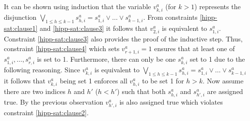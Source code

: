 \documentclass[12pt,a4paper]{article}
\begin{document}
It can be shown using induction that the variable $v^a_{k,i}$ (for $k>1$) represents the disjunction $\bigvee_{1\leq h\leq k-1}s^a_{h,i} = s^a_{1,i}\vee\dots \vee s^a_{k-1,i}$.
From constraints \eqref{hipp-sat:clause1} and \eqref{hipp-sat:clause3} it follows that $v^a_{2,i}$ is equivalent to $s^a_{1,i}$.
Constraint \eqref{hipp-sat:clause3} also provides the proof of the inductive step.
Thus, constraint \eqref{hipp-sat:clause4} which sets $v^a_{r+1,i}=1$ ensures that at least one of $s^a_{1,i},\dots , s^a_{r,i}$ is set to 1.
Furthermore, there can only be one $s^a_{k,i}$ set to 1 due to the following reasoning.
Since $v^a_{k,i}$ is equivalent to $\bigvee_{1\leq h\leq k-1}s^a_{h,i} = s^a_{1,i}\vee\dots \vee s^a_{k-1,i}$ it follows that $v^a_{k,i}$ being set 1 enforces all $v^a_{h,i}$ to be set 1 for $h>k$.
Now assume there are two indices $h$ and $h'$ ($h<h'$) such that both $s^a_{h,i}$ and $s^a_{h',i}$ are assigned true.
By the previous observation $v^a_{h',i}$ is also assigned true which violates constraint \eqref{hipp-sat:clause2}.
\end{document}
